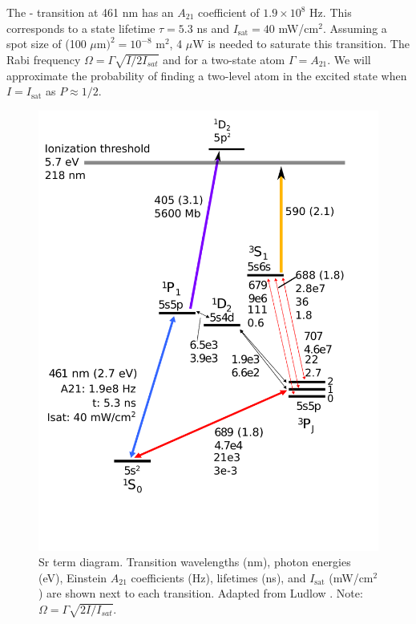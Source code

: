 The \sSz- \sPo transition at 461 nm has an $A_{21}$ coefficient of $1.9\times10^8$ Hz. This corresponds to a state lifetime $\tau=5.3$ ns and $I_\textrm{sat}= 40$ mW/cm$^2$. Assuming a spot size of (100 $\mu\textrm{m})^2 =10^{-8}\textrm{ m}^2$, 4 $\mu\textrm{W}$ is needed to saturate this transition. The Rabi frequency $\Omega = \Gamma \sqrt{I/2I_{sat}}$ and for a two-state atom $\Gamma=A_{21}$. We will approximate the probability of finding a two-level atom in the excited state when $I=I_\textrm{sat}$ as $P\approx1/2$.


\begin{figure}
\centerline{\includegraphics[scale=0.65]{Figures/LudlowSrDiagramMod.pdf}}
\caption[Strontium term diagram.]{\label{SrTerm}Sr term diagram. Transition wavelengths (nm), photon energies (eV), Einstein $A_{21}$ coefficients (Hz), lifetimes (ns), and $I_\textrm{sat}$ (mW/cm$^2$) are shown next to each transition. Adapted from Ludlow \cite{Lud08}. Note: $\Omega = \Gamma \sqrt{2I/I_{sat}}$.}
\end{figure}



